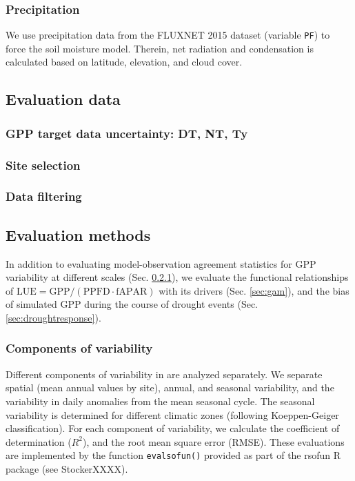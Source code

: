 \documentclass{myreport}
\begin{document}
\subsubsection{Precipitation}
\label{sec:precipitation}
We use precipitation data from the FLUXNET 2015 dataset (variable \texttt{P\textunderscore F}) to force the soil moisture model. Therein, net radiation and condensation is calculated based on latitude, elevation, and cloud cover.

\subsection{Evaluation data}

\subsubsection{GPP target data uncertainty: DT, NT, Ty}
\label{sec:gppdata}

\subsubsection{Site selection}
\label{sec:sites}

\subsubsection{Data filtering}
\label{sec:datafiltering}

\subsection{Evaluation methods}

In addition to evaluating model-observation agreement statistics for GPP variability at different scales (Sec. \ref{sec:evalmethod_variability}), we evaluate the functional relationships of $\text{LUE} = \text{GPP} / (\text{PPFD} \cdot \text{fAPAR})$ with its drivers (Sec. \ref{sec:gam}), and the bias of simulated GPP during the course of drought events (Sec. \ref{sec:droughtresponse}).

\subsubsection{Components of variability}
\label{sec:evalmethod_variability}
Different components of variability in are analyzed separately. We separate spatial (mean annual values by site), annual, and seasonal variability, and the variability in daily anomalies from the mean seasonal cycle. The seasonal variability is determined for different climatic zones (following Koeppen-Geiger classification). For each component of variability, we calculate the coefficient of determination ($R^2$), and the root mean square error (RMSE). These evaluations are implemented by the function \texttt{eval\textunderscore sofun()} provided as part of the rsofun R package (see StockerXXXX).
\end{document}
